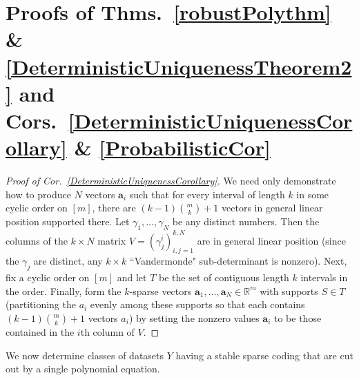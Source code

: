 \documentclass[journal, twocolumn]{IEEEtran}
\newtheorem{remark}{Remark}
\begin{document}

\section{Proofs of Thms.~\ref{robustPolythm} \& \ref{DeterministicUniquenessTheorem2} and Cors.~\ref{DeterministicUniquenessCorollary} \& \ref{ProbabilisticCor}}\label{AppendixB}

\begin{proof}[Proof of Cor.~\ref{DeterministicUniquenessCorollary}]
We need only demonstrate how to produce $N$ vectors $\mathbf{a}_i$ such that for every interval of length $k$ in some cyclic order on $[m]$, there are  \mbox{$(k-1){m \choose k}+1$} vectors in general linear position supported there. Let $\gamma_1, \ldots, \gamma_N$ be any distinct numbers. Then the columns of the $k \times N$ matrix $V = (\gamma^i_j)^{k,N}_{i,j=1}$ are in general linear position (since the $\gamma_j$ are distinct, any $k \times k$ ``Vandermonde" sub-determinant is nonzero). Next, fix a cyclic order on $[m]$ and let $T$ be the set of contiguous length $k$ intervals in the order. Finally, form the $k$-sparse vectors $\mathbf{a}_1, \ldots, \mathbf{a}_N \in \mathbb{R}^m$ with supports $S \in T$ (partitioning the $a_i$ evenly among these supports so that each contains $(k-1){m \choose k}+1$ vectors $a_i$) by setting the nonzero values $\mathbf{a}_i$ to be those contained in the $i$th column of $V$.
\end{proof}

We now determine classes of datasets $Y$ having a stable sparse coding that are cut out by a single polynomial equation.
\end{document}
